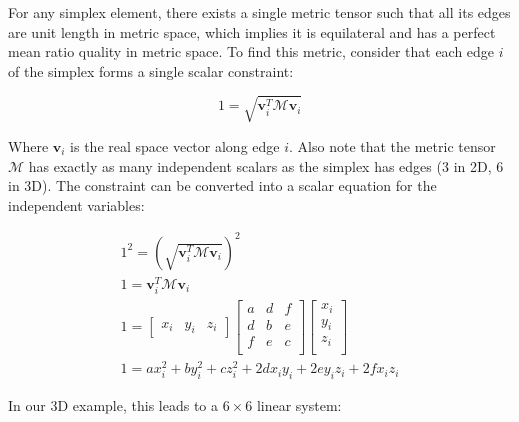 For any simplex element, there exists a single metric tensor
such that all its edges are unit length in metric space, which
implies it is equilateral and has a perfect mean ratio quality
in metric space.
To find this metric, consider that each edge $i$ of the simplex
forms a single scalar constraint:

\begin{equation}
1 = \sqrt{\mathbf{v}_i^T \mathcal{M} \mathbf{v}_i}
\end{equation}

Where $\mathbf{v}_i$ is the real space vector along edge $i$.
Also note that the metric tensor $\mathcal{M}$ has exactly as
many independent scalars as the simplex has edges
($3$ in 2D, $6$ in 3D).
The constraint can be converted into a scalar equation
for the independent variables:

\begin{gather*}
1^2 = \left(\sqrt{\mathbf{v}_i^T \mathcal{M} \mathbf{v}_i}\right)^2 \\
1 = \mathbf{v}_i^T \mathcal{M} \mathbf{v}_i \\
1 = \begin{bmatrix} x_i & y_i & z_i \end{bmatrix}
\begin{bmatrix}
a & d & f \\
d & b & e \\
f & e & c \\
\end{bmatrix}
\begin{bmatrix}
x_i \\
y_i \\
z_i \\
\end{bmatrix} \\
1 = ax_i^2 + by_i^2 + cz_i^2 + 2dx_iy_i + 2ey_iz_i + 2fx_iz_i
\end{gather*}

In our 3D example, this leads to a $6\times 6$ linear system:

